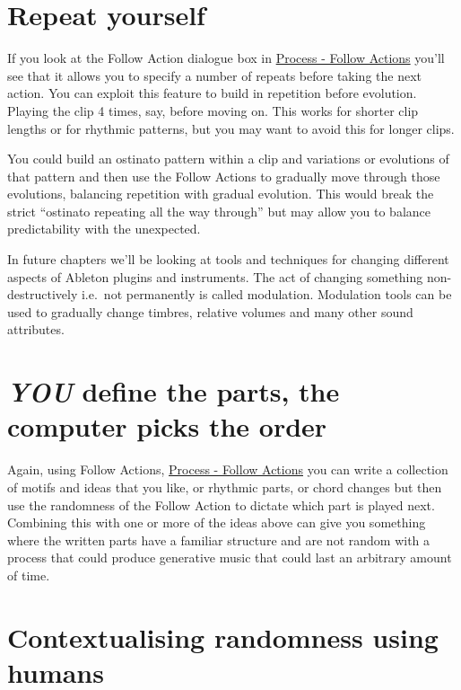 \documentclass[
  12pt,
  letterpaper,
  oneside,
  open=any]{scrbook}
\begin{document}
\section{Repeat yourself}\label{repeat-yourself}

If you look at the Follow Action dialogue box in
\hyperref[Chapter-003-Process-Follow_Actions]{Process - Follow Actions}
you'll see that it allows you to specify a number of repeats before
taking the next action. You can exploit this feature to build in
repetition before evolution. Playing the clip 4 times, say, before
moving on. This works for shorter clip lengths or for rhythmic patterns,
but you may want to avoid this for longer clips.

You could build an ostinato pattern within a clip and variations or
evolutions of that pattern and then use the Follow Actions to gradually
move through those evolutions, balancing repetition with gradual
evolution. This would break the strict ``ostinato repeating all the way
through'' but may allow you to balance predictability with the
unexpected.

In future chapters we'll be looking at tools and techniques for changing
different aspects of Ableton plugins and instruments. The act of
changing something non-destructively i.e.~not permanently is called
modulation. Modulation tools can be used to gradually change timbres,
relative volumes and many other sound attributes.

\section{\texorpdfstring{\textbf{\emph{YOU}} define the parts, the
computer picks the
order}{YOU define the parts, the computer picks the order}}\label{you-define-the-parts-the-computer-picks-the-order}

Again, using Follow Actions,
\hyperref[Chapter-003-Process-Follow_Actions]{Process - Follow Actions}
you can write a collection of motifs and ideas that you like, or
rhythmic parts, or chord changes but then use the randomness of the
Follow Action to dictate which part is played next. Combining this with
one or more of the ideas above can give you something where the written
parts have a familiar structure and are not random with a process that
could produce generative music that could last an arbitrary amount of
time.

\section{Contextualising randomness using
humans}\label{contextualising-randomness-using-humans}
\end{document}
